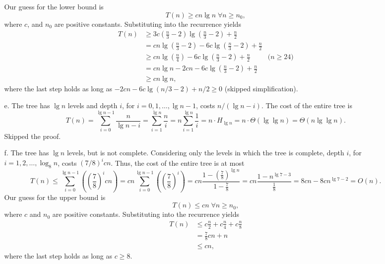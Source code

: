 \documentclass{report}
\makeatletter
\renewenvironment{framed}{%
 \def\FrameCommand##1{\hskip\@totalleftmargin
 \fboxsep=\FrameSep\fbox{##1}}%
 \MakeFramed {\advance\hsize-\width
   \@totalleftmargin\z@ \linewidth\hsize
   \@setminipage}}%
 {\par\unskip\endMakeFramed}
\DeclareMathOperator{\Forall}{\forall}
\makeatother
\begin{document}
\begin{enumerate}
\begin{framed}
\begin{enumerate}
      Our guess for the lower bound is
      \[
      T(n) \ge c n \lg n \; \Forall n \ge n_0,
      \]
      where $c$, and $n_0$ are positive constants. Substituting into the recurrence
      yields
      \begin{equation*}
      \begin{aligned}
        T(n) &\ge 3c \left(\frac{n}{3} - 2\right) \lg \left(\frac{n}{3} - 2\right) + \frac{n}{2}\\
             &=   c n \lg \left(\frac{n}{3} - 2\right) - 6c \lg \left(\frac{n}{3} - 2\right) + \frac{n}{2}\\
             &\ge cn \lg \left(\frac{n}{4}\right) - 6c \lg \left(\frac{n}{3} - 2\right) + \frac{n}{2} & \text{($n \ge 24$)}\\
             &=   cn \lg n - 2cn - 6c \lg \left(\frac{n}{3} - 2\right) + \frac{n}{2}\\
             &\ge cn \lg n,
      \end{aligned}
      \end{equation*}
      where the last step holds as long as $-2cn - 6c \lg (n/3 - 2) + n/2 \ge 0$
      (skipped simplification).
    \item[e.] The tree has $\lg n$ levels and depth $i$, for $i = 0, 1,
      \dots, \lg n - 1$, costs $n/(\lg n - i)$. The cost of the entire
      tree is
      \[
        T(n) = \sum_{i = 0}^{\lg n - 1} \frac{n}{\lg n - i}
             = \sum_{i = 1}^{\lg n} \frac{n}{i}
             = n \sum_{i = 1}^{\lg n} \frac{1}{i}
             = n \cdot H_{\lg n}
             = n \cdot \Theta(\lg \lg n)
             = \Theta(n \lg \lg n).
      \]
      Skipped the proof.
    \item[f.] The tree has $\lg n$ levels, but is not complete. Considering
      only the levels in which the tree is complete, depth $i$, for
      $i = 1, 2, \dots, \log_8 n$, costs $(7/8)^i cn$. Thus, the cost of the
      entire tree is at most
      \[
        T(n) \le \sum_{i=0}^{\lg n - 1} \left( \left(\frac{7}{8}\right)^i cn \right)
             = cn \sum_{i=0}^{\lg n - 1} \left( \left(\frac{7}{8}\right)^i \right)
             = cn \frac{1 - \left(\frac{7}{8}\right)^{\lg n}}{1 - \frac{7}{8}}
             = cn \frac{1 - n^{\lg 7 - 3}}{\frac{1}{8}}
             = 8cn - 8cn^{\lg 7 - 2}
             = O(n).
      \]
      Our guess for the upper bound is
      \[
      T(n) \le c n \; \Forall n \ge n_0,
      \]
      where $c$ and $n_0$ are positive constants. Substituting into the recurrence
      yields
      \begin{equation*}
      \begin{aligned}
        T(n) &\le c \frac{n}{2} + c \frac{n}{4} + c \frac{n}{8}\\
             &= \frac{7}{8} cn + n\\
             &\le cn,
      \end{aligned}
      \end{equation*}
      where the last step holds as long as $c \ge 8$.


\end{enumerate}
\end{framed}
\end{enumerate}
\end{document}
